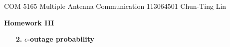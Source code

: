 \documentclass[letterpaper,12pt]{article}
\begin{document}
  \noindent COM 5165 Multiple Antenna Communication \hfill 113064501 Chun-Ting Lin\\

  \begin{center}
    {\bf \large  Homework III}
  \end{center}


  \begin{enumerate}
    \item[{\bf 2. }]  \textbf{$\epsilon$-outage probability} \hfill \\
      
  \end{enumerate}
\end{document}
